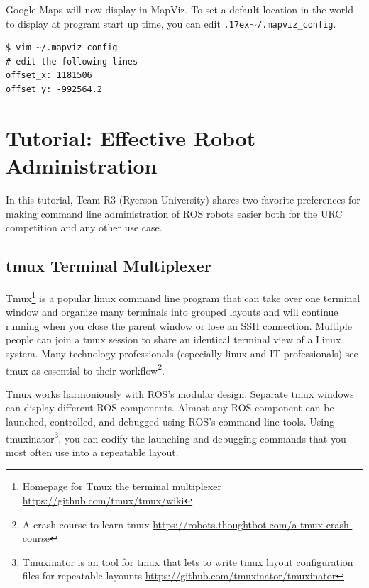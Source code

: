 \documentclass[runningheads,a4paper]{llncs}
\begin{document}
Google Maps will now display in MapViz. To set a default location in the world to display at program start up time, you can edit \texttt{{\raise.17ex\hbox{$\scriptstyle\sim$}}/.mapviz\_config}.

\begin{lstlisting}[frame=single,basicstyle=\ttfamily\footnotesize,breaklines=true,caption={MapViz setting for default viewing location (within a ROS frame) when GUI opens.},captionpos=b]
$ vim ~/.mapviz_config 
# edit the following lines
offset_x: 1181506
offset_y: -992564.2
\end{lstlisting}


\section{Tutorial: Effective Robot Administration}\label{administration}

In this tutorial, Team R3 (Ryerson University) shares two favorite preferences for making command line administration of ROS robots easier both for the URC competition and any other use case.



\subsection{tmux Terminal Multiplexer}

Tmux\footnote{Homepage for Tmux the terminal multiplexer \url{https://github.com/tmux/tmux/wiki}} is a popular linux command line program that can take over one terminal window and organize many terminals into grouped layouts and will continue running when you close the parent window or lose an SSH connection. Multiple people can join a tmux session to share an identical terminal view of a Linux system. Many technology professionals (especially linux and IT professionals) see tmux as essential to their workflow\footnote{A crash course to learn tmux \url{https://robots.thoughtbot.com/a-tmux-crash-course}}.

Tmux works harmoniously with ROS's modular design. Separate tmux windows can display different ROS components. Almost any ROS component can be launched, controlled, and debugged using ROS's command line tools. Using tmuxinator\footnote{Tmuxinator is an tool for tmux that lets to write tmux layout configuration files for repeatable layounts \url{https://github.com/tmuxinator/tmuxinator}}, you can codify the launching and debugging commands that you most often use into a repeatable layout.
\end{document}
